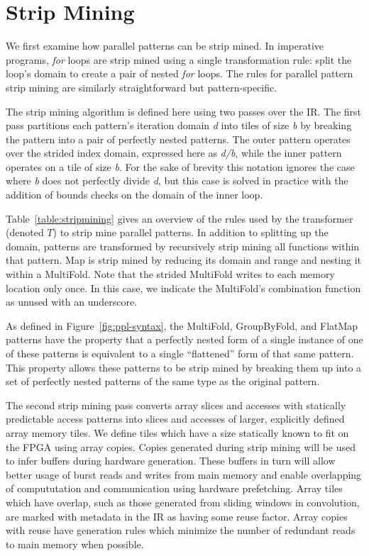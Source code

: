 

\section{Strip Mining}
We first examine how parallel patterns can be strip mined.
In imperative programs, \emph{for} loops are strip mined using a single transformation
rule: split the loop's domain to create a pair of nested \emph{for} loops.
The rules for parallel pattern strip mining are similarly straightforward
but pattern-specific.

The strip mining algorithm is defined here using two passes over the IR.
The first pass partitions each pattern's iteration domain \emph{d} into tiles of
size \emph{b} by breaking the pattern into a pair of perfectly nested patterns.
The outer pattern operates over the strided index domain, expressed here as
\emph{d/b}, while the inner pattern operates on a tile of size \emph{b}.
For the sake of brevity this notation ignores the case where \emph{b} does not
perfectly divide \emph{d}, but this case is solved in practice with the
addition of bounds checks on the domain of the inner loop.

Table~\ref{table:stripmining} gives an overview of the rules used by the transformer
(denoted $T$) to strip mine parallel patterns.
In addition to splitting up the domain, patterns are transformed by recursively
strip mining all functions within that pattern.
Map is strip mined by reducing its domain and range and nesting it within a MultiFold.
Note that the strided MultiFold writes to each memory location only once.
In this case, we indicate the MultiFold's combination function as unused with an underscore.

As defined in Figure~\ref{fig:ppl-syntax}, the MultiFold, GroupByFold, and FlatMap patterns have the property that a perfectly nested form of a single instance of one of these
patterns is equivalent to a single ``flattened'' form of that same pattern. This property allows these patterns to be strip mined by
breaking them up into a set of perfectly nested patterns of the same type as the original pattern.

The second strip mining pass converts array slices and accesses with statically predictable access patterns into slices and accesses of larger, explicitly defined
array memory tiles. We define tiles which have a size statically known to fit on the FPGA using array copies.
Copies generated during strip mining will be used to infer buffers during hardware generation.
These buffers in turn will allow better usage of burst reads and writes from main memory and enable overlapping of compututation and communication using hardware prefetching.
Array tiles which have overlap, such as those generated from sliding windows in convolution, are marked with metadata in the IR as having some reuse factor.
Array copies with reuse have generation rules which minimize the number of redundant reads to main memory when possible.

